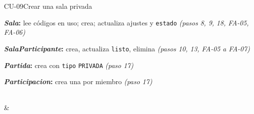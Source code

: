 \begin{fichacu}{CU-09}{Crear una sala privada}
{\begin{cudatos}
      \item \textbf{\textit{Sala}:} lee códigos en uso; crea; actualiza ajustes y \texttt{estado} \textit{(pasos 8, 9, 18, \mbox{FA-05}, \mbox{FA-06})}
      \item \textbf{\textit{SalaParticipante}:} crea, actualiza \texttt{listo}, elimina \textit{(pasos 10, 13, \mbox{FA-05} a \mbox{FA-07})}
      \item \textbf{\textit{Partida}:} crea con \texttt{tipo} \texttt{PRIVADA} \textit{(paso 17)}
      \item \textbf{\textit{Participacion}:} crea una por miembro \textit{(paso 17)}
    \end{cudatos}} \\
   &  \\ \hline
\end{fichacu}
\clearpage
